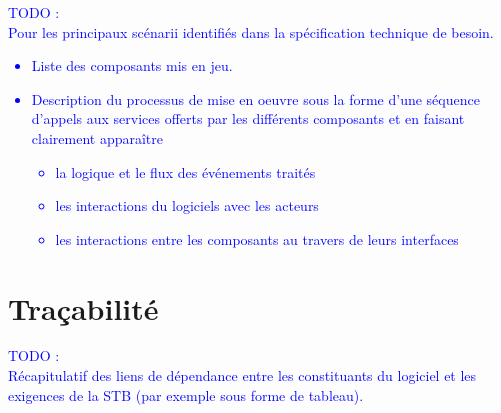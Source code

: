 \documentclass{../res/univ-projet}
\begin{document}
  \textcolor{blue}{
    TODO : \\
    Pour les principaux scénarii identifiés dans la spécification technique de besoin.
    \begin{itemize}
      \item Liste des composants mis en jeu.
      \item Description du processus de mise en oeuvre sous la forme d'une
      séquence d'appels aux services offerts par les différents composants et en faisant
      clairement apparaître
      \begin{itemize}
        \item la logique et le flux des événements traités
        \item les interactions du logiciels avec les acteurs
        \item les interactions entre les composants au travers de leurs interfaces
      \end{itemize}
    \end{itemize}
  }

\section{Traçabilité} %
\label{sec:tra_abilit_}

  \textcolor{blue}{
    TODO : \\
    Récapitulatif des liens de dépendance entre les constituants du logiciel et les exigences de
    la STB (par exemple sous forme de tableau).
  }

\end{document}
